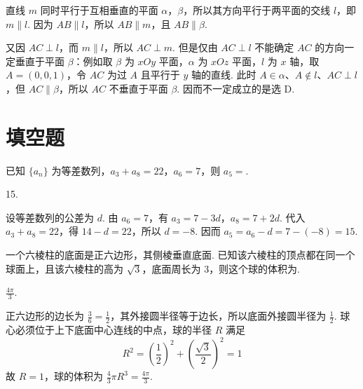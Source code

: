 \begin{solution}
直线 \(m\) 同时平行于互相垂直的平面 \(\alpha\)，\(\beta\)，所以其方向平行于两平面的交线 \(l\)，即 \(m\parallel l\). 因为 \(AB\parallel l\)，所以 \(AB\parallel m\)，且 \(AB\parallel\beta\).

又因 \(AC\perp l\)，而 \(m\parallel l\)，所以 \(AC\perp m\). 但是仅由 \(AC\perp l\) 不能确定 \(AC\) 的方向一定垂直于平面 \(\beta\)：例如取 \(\beta\) 为 \(xOy\) 平面，\(\alpha\) 为 \(xOz\) 平面，\(l\) 为 \(x\) 轴，取 \(A=(0,0,1)\)，令 \(AC\) 为过 \(A\) 且平行于 \(y\) 轴的直线. 此时 \(A\in\alpha\)、\(A\notin l\)、\(AC\perp l\)，但 \(AC\parallel\beta\)，所以 \(AC\) 不垂直于平面 \(\beta\). 因而不一定成立的是选 D.
\end{solution}

\section{填空题}

\begin{problem}
已知 \( \{a_{n}\} \) 为等差数列，\( a_{3} + a_{8} = 22 \)，\( a_{6} = 7 \)，则 \( a_{5} = \)\fillinblank{}.
\end{problem}

\begin{answer}
15.
\end{answer}

\begin{solution}
设等差数列的公差为 \(d\). 由 \(a_6=7\)，有 \(a_3=7-3d\)，\(a_8=7+2d\). 代入 \(a_3+a_8=22\)，得 \(14-d=22\)，所以 \(d=-8\). 因而 \(a_5=a_6-d=7-(-8)=15\).
\end{solution}

\begin{problem}
一个六棱柱的底面是正六边形，其侧棱垂直底面. 已知该六棱柱的顶点都在同一个球面上，且该六棱柱的高为 \(\sqrt{3}\)，底面周长为 \(3\)，则这个球的体积为\fillinblank{}.
\end{problem}

\begin{answer}
\(\frac{4\pi}{3}\).
\end{answer}

\begin{solution}
正六边形的边长为 \(\frac{3}{6}=\frac12\)，其外接圆半径等于边长，所以底面外接圆半径为 \(\frac12\). 球心必须位于上下底面中心连线的中点，球的半径 \(R\) 满足
\[
R^2=\left(\frac12\right)^2+\left(\frac{\sqrt3}{2}\right)^2=1
\]
故 \(R=1\)，球的体积为 \(\frac43\pi R^3=\frac{4\pi}{3}\).
\end{solution}

